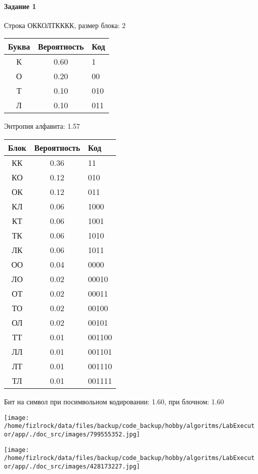\documentclass[a4paper, 12pt]{article}
\begin{document}
\paragraph{Задание 1}

Строка ОККОЛТКККК, размер блока: 2
\begin{center}
 \begin{tabular}{ |c|c|l| } 
  \hline
     Буква & Вероятность & Код\\ \hline
К & 0.60 & 1\\\hline
О & 0.20 & 00\\\hline
Т & 0.10 & 010\\\hline
Л & 0.10 & 011
\\ \hline \end{tabular}
\end{center}
Энтропия алфавита: 1.57
\begin{center}
 \begin{tabular}{ |c|c|l| } 
  \hline
     Блок & Вероятность & Код\\ \hline
КК & 0.36 & 11\\\hline
КО & 0.12 & 010\\\hline
ОК & 0.12 & 011\\\hline
КЛ & 0.06 & 1000\\\hline
КТ & 0.06 & 1001\\\hline
ТК & 0.06 & 1010\\\hline
ЛК & 0.06 & 1011\\\hline
ОО & 0.04 & 0000\\\hline
ЛО & 0.02 & 00010\\\hline
ОТ & 0.02 & 00011\\\hline
ТО & 0.02 & 00100\\\hline
ОЛ & 0.02 & 00101\\\hline
ТТ & 0.01 & 001100\\\hline
ЛЛ & 0.01 & 001101\\\hline
ЛТ & 0.01 & 001110\\\hline
ТЛ & 0.01 & 001111
\\ \hline \end{tabular}
\end{center}
Бит на символ при посимвольном кодировании: 1.60, при блочном: 1.60

\texttt{[image: /home/fizlrock/data/files/backup/code\_backup/hobby/algoritms/LabExecutor/app/./doc\_src/images/799555352.jpg]}

\texttt{[image: /home/fizlrock/data/files/backup/code\_backup/hobby/algoritms/LabExecutor/app/./doc\_src/images/428173227.jpg]}
\end{document}
